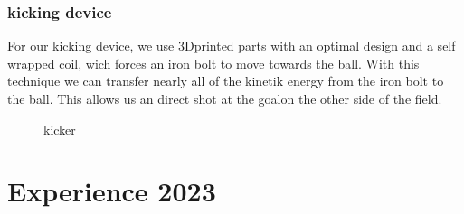 \documentclass{scrartcl}
\begin{document}
\subsubsection{kicking device}
For our kicking device, we use 3Dprinted parts with an optimal design and a self wrapped coil, wich forces an iron bolt to move towards the ball.
With this technique we can transfer nearly all of the kinetik energy from the iron bolt to the ball. This allows us an direct
shot at the goalon the other side of the field.

\begin{figure}[!h]
    \begin{center}
    \caption{kicker}
    \label{kicker}
    \end{center}
    \end{figure}

\section{Experience 2023}
\end{document}
